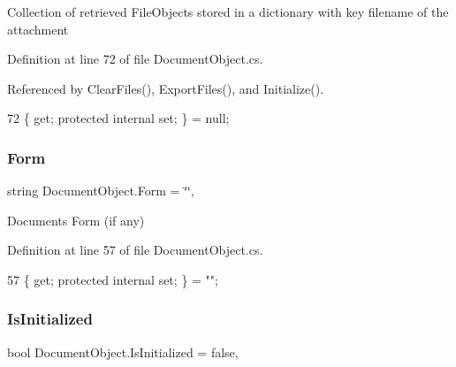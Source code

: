 Collection of retrieved File\+Objects stored in a dictionary with key filename of the attachment 



Definition at line 72 of file Document\+Object.\+cs.



Referenced by Clear\+Files(), Export\+Files(), and Initialize().


\begin{DoxyCode}
72 \{ \textcolor{keyword}{get}; \textcolor{keyword}{protected} \textcolor{keyword}{internal} \textcolor{keyword}{set}; \} = null;
\end{DoxyCode}
\mbox{\label{class_document_object_ad3444a6c018474405064070fa9a94afe}} 
\subsubsection{\texorpdfstring{Form}{Form}}
{\footnotesize\ttfamily string Document\+Object.\+Form = \char`\"{}\char`\"{}\hspace{0.3cm}{\ttfamily [get]}, {\ttfamily [set]}}



Documents Form (if any) 



Definition at line 57 of file Document\+Object.\+cs.


\begin{DoxyCode}
57 \{ \textcolor{keyword}{get}; \textcolor{keyword}{protected} \textcolor{keyword}{internal} \textcolor{keyword}{set}; \} = \textcolor{stringliteral}{""};
\end{DoxyCode}
\mbox{\label{class_document_object_a3b2075b73f38d05091b69decc6ce7992}} 
\subsubsection{\texorpdfstring{Is\+Initialized}{IsInitialized}}
{\footnotesize\ttfamily bool Document\+Object.\+Is\+Initialized = false\hspace{0.3cm}{\ttfamily [get]}, {\ttfamily [set]}}



